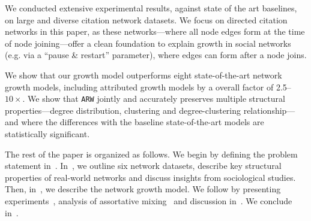 We conducted extensive experimental results, against state of the art
baselines, on large and diverse citation network datasets. We focus on directed citation networks in this paper, as these networks---where all node edges form at the time of node joining---offer a clean foundation to explain growth in social networks (e.g. via a ``pause \& restart'' parameter), where edges can form after a node joins.

We show that our growth model outperforms eight state-of-the-art network growth models, including attributed growth models by a overall factor of 2.5--$10\times$. We show that \texttt{ARW} jointly and accurately preserves
multiple structural properties---degree distribution, clustering and
degree-clustering relationship---and where the differences with the baseline state-of-the-art models are statistically significant.

The rest of the paper is organized as follows.
We begin by defining the problem statement in~.
In~, we outline six network datasets, describe key structural
properties of real-world networks and discuss insights from sociological studies.
Then, in~, we describe the network growth model. We follow by presenting experiments~, analysis of assortative mixing~
and discussion in~. We conclude in~.

